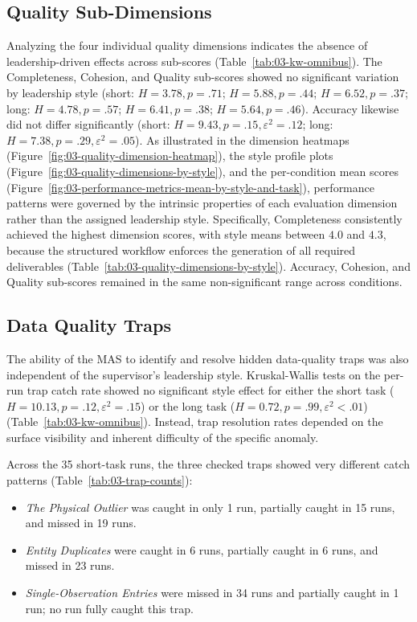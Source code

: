 \subsection{Quality Sub-Dimensions}
\label{subsec:quality-sub-dimensions}

Analyzing the four individual quality dimensions indicates the absence of leadership-driven effects across sub-scores (Table~\ref{tab:03-kw-omnibus}).
The Completeness, Cohesion, and Quality sub-scores showed no significant variation by leadership style (short: $H = 3.78, p = .71$; $H = 5.88, p = .44$; $H = 6.52, p = .37$; long: $H = 4.78, p = .57$; $H = 6.41, p = .38$; $H = 5.64, p = .46$).
Accuracy likewise did not differ significantly (short: $H = 9.43, p = .15, \varepsilon^2 = .12$; long: $H = 7.38, p = .29, \varepsilon^2 = .05$).
As illustrated in the dimension heatmaps (Figure~\ref{fig:03-quality-dimension-heatmap}), the style profile plots (Figure~\ref{fig:03-quality-dimensions-by-style}), and the per-condition mean scores (Figure~\ref{fig:03-performance-metrics-mean-by-style-and-task}), performance patterns were governed by the intrinsic properties of each evaluation dimension rather than the assigned leadership style.
Specifically, Completeness consistently achieved the highest dimension scores, with style means between $4.0$ and $4.3$, because the structured workflow enforces the generation of all required deliverables (Table~\ref{tab:03-quality-dimensions-by-style}). 
Accuracy, Cohesion, and Quality sub-scores remained in the same non-significant range across conditions.

\subsection{Data Quality Traps}
\label{subsec:results-data-quality-traps}

The ability of the \ac{MAS} to identify and resolve hidden data-quality traps was also independent of the supervisor's leadership style.
Kruskal-Wallis tests on the per-run trap catch rate showed no significant style effect for either the short task ($H = 10.13, p = .12, \varepsilon^2 = .15$) or the long task ($H = 0.72, p = .99, \varepsilon^2 < .01$) (Table~\ref{tab:03-kw-omnibus}).
Instead, trap resolution rates depended on the surface visibility and inherent difficulty of the specific anomaly.

Across the 35 short-task runs, the three checked traps showed very different catch patterns (Table~\ref{tab:03-trap-counts}):
\begin{itemize}
    \item \textit{The Physical Outlier} was caught in only 1 run, partially caught in 15 runs, and missed in 19 runs.
    \item \textit{Entity Duplicates} were caught in 6 runs, partially caught in 6 runs, and missed in 23 runs.
    \item \textit{Single-Observation Entries} were missed in 34 runs and partially caught in 1 run; no run fully caught this trap.
\end{itemize}

